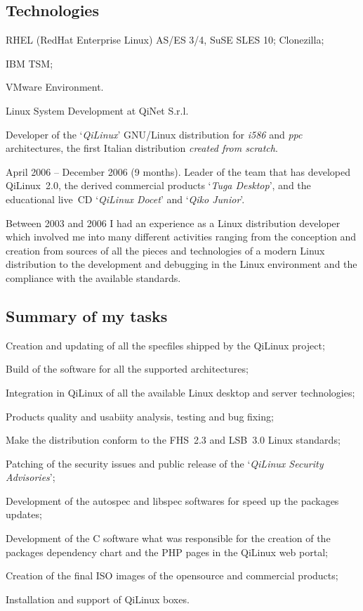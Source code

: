 \subsection{Technologies}

\item{\bdot} RHEL (RedHat Enterprise Linux) AS/ES 3/4, SuSE SLES 10; Clonezilla;
\item{\bdot} IBM TSM;
\item{\bdot} VMware Environment.
 

\bigskip
{}
   {Linux System Development at QiNet S.r.l.}

\noindent
Developer of the `{\it QiLinux\/}' GNU/Linux distribution for {\it i586} and
{\it ppc} architectures, the first Italian distribution
{\it created from scratch}.

\noindent
April 2006 -- December 2006 (9 months). 
Leader of the team that has developed QiLinux~2.0, the derived commercial 
products `{\it Tuga Desktop\/}', and the educational live~CD 
`{\it QiLinux Docet\/}' and `{\it Qiko Junior\/}'.

Between 2003 and 2006 I had an experience as a Linux distribution developer 
which involved me into many different activities ranging from the conception
and creation from sources of all the pieces and technologies of a modern Linux
distribution to the development and debugging in the Linux environment and 
the compliance with the available standards.

\subsection{Summary of my tasks}

\item{\bdot} Creation and updating of all the specfiles shipped by the QiLinux project;
\item{\bdot} Build of the software for all the supported architectures;
\item{\bdot} Integration in QiLinux of all the available Linux desktop and server technologies;
\item{\bdot} Products quality and usabiity analysis, testing and bug fixing;
\item{\bdot} Make the distribution conform to the FHS~2.3 and LSB~3.0 Linux standards;
\item{\bdot} Patching of the security issues and public release of the 
   `{\it QiLinux Security Advisories\/}';
\item{\bdot} Development of the autospec and libspec softwares for speed up the packages updates;
\item{\bdot} Development of the C software what was responsible for the creation
   of the packages dependency chart and the PHP pages in the QiLinux web portal;
\item{\bdot} Creation of the final ISO images of the opensource and commercial products;
\item{\bdot} Installation and support of QiLinux boxes.


